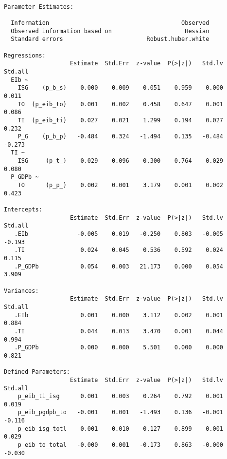 \begin{verbatim}

Parameter Estimates:

  Information                                      Observed
  Observed information based on                     Hessian
  Standard errors                        Robust.huber.white

Regressions:
                   Estimate  Std.Err  z-value  P(>|z|)   Std.lv  Std.all
  EIb ~                                                                 
    ISG    (p_b_s)    0.000    0.009    0.051    0.959    0.000    0.011
    TO  (p_eib_to)    0.001    0.002    0.458    0.647    0.001    0.086
    TI  (p_eib_ti)    0.027    0.021    1.299    0.194    0.027    0.232
    P_G    (p_b_p)   -0.484    0.324   -1.494    0.135   -0.484   -0.273
  TI ~                                                                  
    ISG     (p_t_)    0.029    0.096    0.300    0.764    0.029    0.080
  P_GDPb ~                                                              
    TO      (p_p_)    0.002    0.001    3.179    0.001    0.002    0.423

Intercepts:
                   Estimate  Std.Err  z-value  P(>|z|)   Std.lv  Std.all
   .EIb              -0.005    0.019   -0.250    0.803   -0.005   -0.193
   .TI                0.024    0.045    0.536    0.592    0.024    0.115
   .P_GDPb            0.054    0.003   21.173    0.000    0.054    3.909

Variances:
                   Estimate  Std.Err  z-value  P(>|z|)   Std.lv  Std.all
   .EIb               0.001    0.000    3.112    0.002    0.001    0.884
   .TI                0.044    0.013    3.470    0.001    0.044    0.994
   .P_GDPb            0.000    0.000    5.501    0.000    0.000    0.821

Defined Parameters:
                   Estimate  Std.Err  z-value  P(>|z|)   Std.lv  Std.all
    p_eib_ti_isg      0.001    0.003    0.264    0.792    0.001    0.019
    p_eib_pgdpb_to   -0.001    0.001   -1.493    0.136   -0.001   -0.116
    p_eib_isg_totl    0.001    0.010    0.127    0.899    0.001    0.029
    p_eib_to_total   -0.000    0.001   -0.173    0.863   -0.000   -0.030

\end{verbatim}

